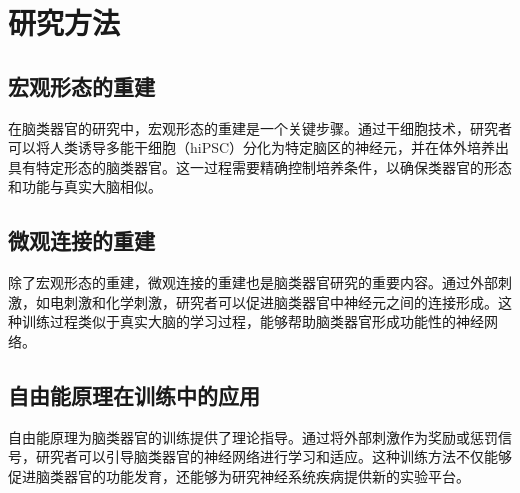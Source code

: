 \chapter{研究方法}\label{chap:methodlogy}

\section{宏观形态的重建}\label{sec:macro-reconstruction}
在脑类器官的研究中，宏观形态的重建是一个关键步骤。通过干细胞技术，研究者可以将人类诱导多能干细胞（hiPSC）分化为特定脑区的神经元，并在体外培养出具有特定形态的脑类器官。这一过程需要精确控制培养条件，以确保类器官的形态和功能与真实大脑相似。

\section{微观连接的重建}\label{sec:micro-reconstruction}
除了宏观形态的重建，微观连接的重建也是脑类器官研究的重要内容。通过外部刺激，如电刺激和化学刺激，研究者可以促进脑类器官中神经元之间的连接形成。这种训练过程类似于真实大脑的学习过程，能够帮助脑类器官形成功能性的神经网络。

\section{自由能原理在训练中的应用}\label{sec:free-energy-application}
自由能原理为脑类器官的训练提供了理论指导。通过将外部刺激作为奖励或惩罚信号，研究者可以引导脑类器官的神经网络进行学习和适应。这种训练方法不仅能够促进脑类器官的功能发育，还能够为研究神经系统疾病提供新的实验平台。

